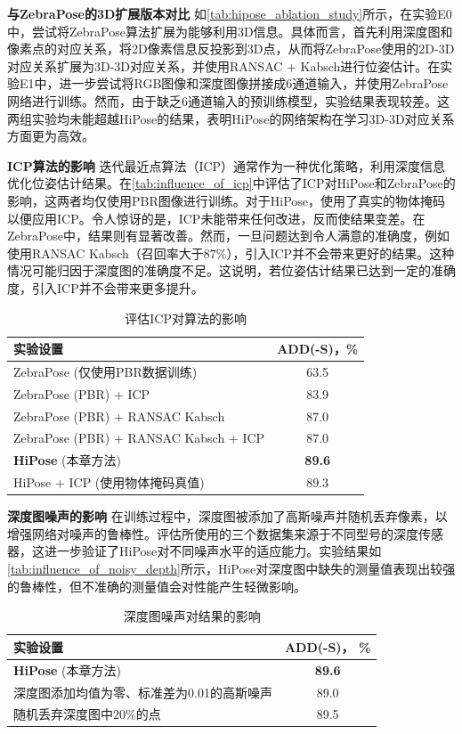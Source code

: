 \textbf{与ZebraPose的3D扩展版本对比 }
如\autoref{tab:hipose_ablation_study}所示，在实验E0中，尝试将ZebraPose算法扩展为能够利用3D信息。具体而言，首先利用深度图和像素点的对应关系，将2D像素信息反投影到3D点，从而将ZebraPose使用的2D-3D对应关系扩展为3D-3D对应关系，并使用RANSAC + Kabsch进行位姿估计。在实验E1中，进一步尝试将RGB图像和深度图像拼接成6通道输入，并使用ZebraPose网络进行训练。然而，由于缺乏6通道输入的预训练模型，实验结果表现较差。这两组实验均未能超越HiPose的结果，表明HiPose的网络架构在学习3D-3D对应关系方面更为高效。

\textbf{ICP算法的影响 }
迭代最近点算法（ICP）通常作为一种优化策略，利用深度信息优化位姿估计结果。在\autoref{tab:influence_of_icp}中评估了ICP对HiPose和ZebraPose的影响，这两者均仅使用PBR图像进行训练。对于HiPose，使用了真实的物体掩码以便应用ICP。令人惊讶的是，ICP未能带来任何改进，反而使结果变差。在ZebraPose中，结果则有显著改善。然而，一旦问题达到令人满意的准确度，例如使用RANSAC Kabsch（召回率大于$87\%$），引入ICP并不会带来更好的结果。这种情况可能归因于深度图的准确度不足。这说明，若位姿估计结果已达到一定的准确度，引入ICP并不会带来更多提升。

\begin{table}[h]
    \centering
    \caption{评估ICP对算法的影响}
    \label{tab:influence_of_icp}
    \begin{tabular}{@{}l|c@{}}
      \toprule
      实验设置 & ADD(-S)，\% \\
      \midrule
      ZebraPose (仅使用PBR数据训练) & 63.5\\
      ZebraPose (PBR) + ICP & 83.9\\
      ZebraPose (PBR) + RANSAC Kabsch & 87.0\\
      ZebraPose (PBR) + RANSAC Kabsch + ICP & 87.0\\
      \midrule
      \textbf{HiPose} (本章方法) &  \textbf{89.6}\\
      HiPose + ICP (使用物体掩码真值) &  89.3\\
      \bottomrule
    \end{tabular}
  \end{table}

\textbf{深度图噪声的影响 }
在训练过程中，深度图被添加了高斯噪声并随机丢弃像素，以增强网络对噪声的鲁棒性。评估所使用的三个数据集来源于不同型号的深度传感器，这进一步验证了HiPose对不同噪声水平的适应能力。实验结果如\autoref{tab:influence_of_noisy_depth}所示，HiPose对深度图中缺失的测量值表现出较强的鲁棒性，但不准确的测量值会对性能产生轻微影响。

\begin{table}[h]
    \centering
    \caption{深度图噪声对结果的影响}
    \label{tab:influence_of_noisy_depth}
        \begin{tabular}{@{}l|c@{}}
          \toprule
          实验设置 & ADD(-S)， \% \\
          \midrule
          \textbf{HiPose} (本章方法) &  \textbf{89.6}\\
          \midrule
          深度图添加均值为零、标准差为0.01的高斯噪声 & 89.0\\
          随机丢弃深度图中$20\%$的点 & 89.5 \\
          \bottomrule
        \end{tabular}
\end{table}

